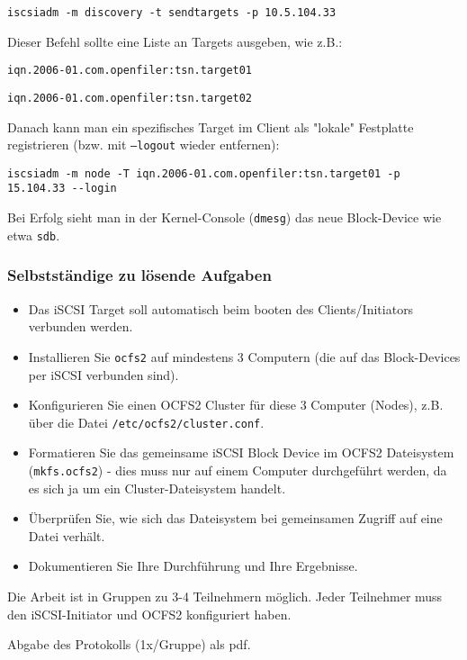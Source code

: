 \texttt{iscsiadm -m discovery -t sendtargets -p 10.5.104.33}

Dieser Befehl sollte eine Liste an Targets ausgeben, wie z.B.:

\texttt{iqn.2006-01.com.openfiler:tsn.target01}

\texttt{iqn.2006-01.com.openfiler:tsn.target02}

Danach kann man ein spezifisches Target im Client als "lokale" Festplatte registrieren (bzw. mit \texttt{--logout} wieder entfernen):

\texttt{iscsiadm -m node -T iqn.2006-01.com.openfiler:tsn.target01 -p 15.104.33 -{}-login}

Bei Erfolg sieht man in der Kernel-Console (\texttt{dmesg}) das neue Block-Device wie etwa \texttt{sdb}.

\subsubsection{Selbstständige zu lösende Aufgaben}
\begin{itemize}
	\item Das iSCSI Target soll automatisch beim booten des Clients/Initiators verbunden werden.
	\item Installieren Sie \texttt{ocfs2} auf mindestens 3 Computern (die auf das Block-Devices per iSCSI verbunden sind).
	\item Konfigurieren Sie einen OCFS2 Cluster für diese 3 Computer (Nodes), z.B. über die Datei \texttt{/etc/ocfs2/cluster.conf}.
	\item Formatieren Sie das gemeinsame iSCSI Block Device im OCFS2 Dateisystem (\texttt{mkfs.ocfs2}) - dies muss nur auf einem Computer durchgeführt werden, da es sich ja um ein Cluster-Dateisystem handelt.
	\item Überprüfen Sie, wie sich das Dateisystem bei gemeinsamen Zugriff auf eine Datei verhält.
	\item Dokumentieren Sie Ihre Durchführung und Ihre Ergebnisse.
\end{itemize}
Die Arbeit ist in Gruppen zu 3-4 Teilnehmern möglich. Jeder Teilnehmer muss den iSCSI-Initiator und OCFS2 konfiguriert haben.

Abgabe des Protokolls (1x/Gruppe) als pdf.
\clearpage
